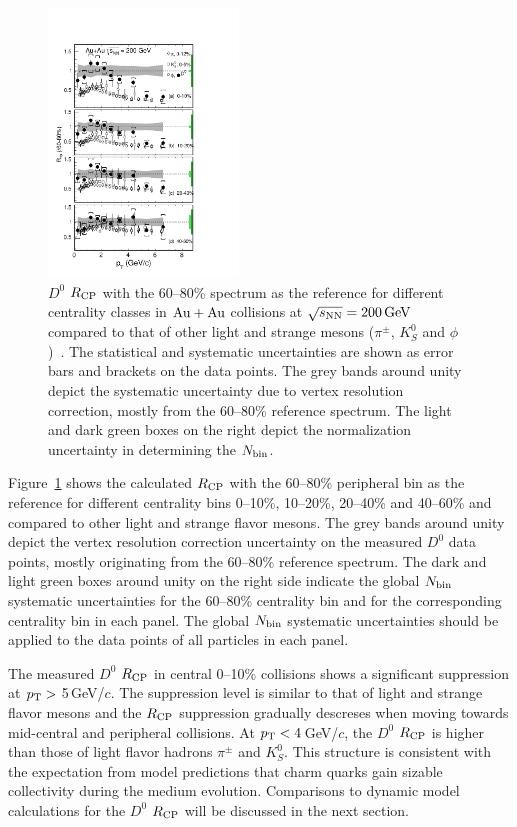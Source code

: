 \documentclass[%
 reprint,	
 amsmath,amssymb,
 aps,
 prc,
]{revtex4-1}
\begin{document}
\begin{figure}
\centering
\includegraphics[width=0.45\textwidth]{fig/D0_Rcp1.pdf}
\caption{$D^{0}$ $R_{\rm CP}$ with the 60--80\% spectrum as the reference for different centrality classes in ${\rm{Au + Au}}$ collisions at ${\sqrt{s_{\rm NN}} = \rm{200\,GeV}}$ compared to that of other light and strange mesons ($\pi^{\pm}$, $K^0_{S}$ and $\phi$)~\cite{Adams2006_Identified,Abelev2009,Agakishiev2012}. The statistical and systematic uncertainties are shown as error bars and brackets on the data points. The grey bands around unity depict the systematic uncertainty due to vertex resolution correction, mostly from the 60--80\% reference spectrum. The light and dark green boxes on the right depict the normalization uncertainty in determining the $N_{\rm bin}$.}
\label{fig:D0_Rcp} 
\end{figure}

Figure~\ref{fig:D0_Rcp} shows the calculated $R_{\rm CP}$ with the 60--80\% peripheral bin as the reference for different centrality bins 0--10\%, 10--20\%, 20--40\% and 40--60\% and compared to other light and strange flavor mesons. The grey bands around unity depict the vertex resolution correction uncertainty on the measured $D^0$ data points, mostly originating from the 60--80\% reference spectrum. The dark and light green boxes around unity on the right side indicate the global $N_{\rm bin}$ systematic uncertainties for the 60--80\% centrality bin and for the corresponding centrality bin in each panel. The global $N_{\rm bin}$ systematic uncertainties should be applied to the data points of all particles in each panel.

The measured $D^0$ $R_{\rm CP}$ in central 0--10\% collisions shows a significant suppression at $p_{\rm T}>$ 5\,GeV/$c$. The suppression level is similar to that of light and strange flavor mesons and the $R_{\rm CP}$ suppression gradually descreses when moving towards mid-central and peripheral collisions. At $p_{\rm T}<4$\,GeV/$c$, the $D^0$ $R_{\rm CP}$ is higher than those of light flavor hadrons $\pi^{\pm}$ and $K_{S}^0$. This structure is consistent with the expectation from model predictions that charm quarks gain sizable collectivity during the medium evolution. Comparisons to dynamic model calculations for the $D^0$ $R_{\rm CP}$ will be discussed in the next section.
\end{document}
